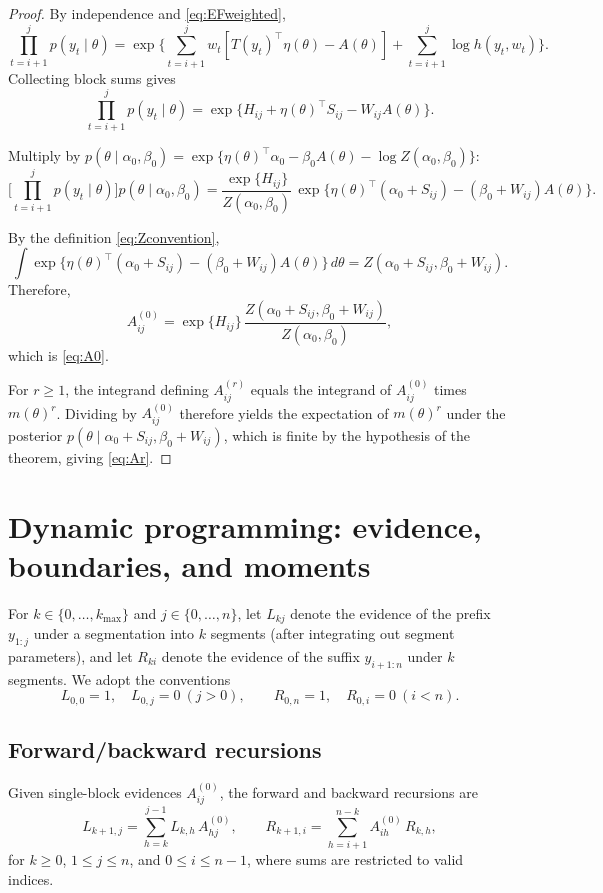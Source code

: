 \begin{proof}
By independence and \eqref{eq:EFweighted},
\[
\prod_{t=i+1}^j p(y_t\mid\theta)
  = \exp\!\Big\{
      \sum_{t=i+1}^j w_t[T(y_t)^\top\eta(\theta) - A(\theta)]
      + \sum_{t=i+1}^j \log h(y_t,w_t)
     \Big\}.
\]
Collecting block sums gives
\[
\prod_{t=i+1}^j p(y_t\mid\theta)
  = \exp\{H_{ij} + \eta(\theta)^\top S_{ij} - W_{ij} A(\theta)\}.
\]

Multiply by $p(\theta\mid\alpha_0,\beta_0)=\exp\{\eta(\theta)^\top\alpha_0 - \beta_0 A(\theta) - \log Z(\alpha_0,\beta_0)\}$:
\[
\Big[\prod_{t=i+1}^j p(y_t\mid\theta)\Big] p(\theta\mid\alpha_0,\beta_0)
 = \frac{\exp\{H_{ij}\}}{Z(\alpha_0,\beta_0)}\,
   \exp\{\eta(\theta)^\top(\alpha_0+S_{ij}) - (\beta_0+W_{ij})A(\theta)\}.
\]

By the definition \eqref{eq:Zconvention},
\[
\int \exp\{\eta(\theta)^\top(\alpha_0+S_{ij}) - (\beta_0+W_{ij})A(\theta)\}\,d\theta
  = Z(\alpha_0+S_{ij},\beta_0+W_{ij}).
\]
Therefore,
\[
A^{(0)}_{ij}
 = \exp\{H_{ij}\}\,\frac{Z(\alpha_0+S_{ij},\beta_0+W_{ij})}{Z(\alpha_0,\beta_0)},
\]
which is \eqref{eq:A0}.

For $r\ge 1$, the integrand defining $A^{(r)}_{ij}$ equals the integrand of $A^{(0)}_{ij}$
times $m(\theta)^r$. Dividing by $A^{(0)}_{ij}$ therefore yields the expectation of
$m(\theta)^r$ under the posterior
$p(\theta\mid \alpha_0+S_{ij},\beta_0+W_{ij})$, which is finite by the hypothesis of the theorem,
giving \eqref{eq:Ar}.
\end{proof}

\section{Dynamic programming: evidence, boundaries, and moments}
\label{sec:dp}

For $k\in\{0,\dots,k_{\max}\}$ and $j\in\{0,\dots,n\}$, let $L_{k j}$ denote the evidence of
the prefix $y_{1:j}$ under a segmentation into $k$ segments (after integrating out segment
parameters), and let $R_{k i}$ denote the evidence of the suffix $y_{i+1:n}$ under $k$
segments. We adopt the conventions
\[
L_{0,0}=1,\quad L_{0,j}=0\ (j>0),\qquad
R_{0,n}=1,\quad R_{0,i}=0\ (i<n).
\]

\subsection{Forward/backward recursions}
Given single-block evidences $A^{(0)}_{ij}$, the forward and backward recursions are
\begin{equation}
L_{k+1,j}
 = \sum_{h=k}^{j-1} L_{k,h}\,A^{(0)}_{h j},\qquad
R_{k+1,i}
 = \sum_{h=i+1}^{n-k} A^{(0)}_{i h}\,R_{k,h},
\label{eq:LR}
\end{equation}
for $k\ge0$, $1\le j\le n$, and $0\le i\le n-1$, where sums are restricted to valid indices.

